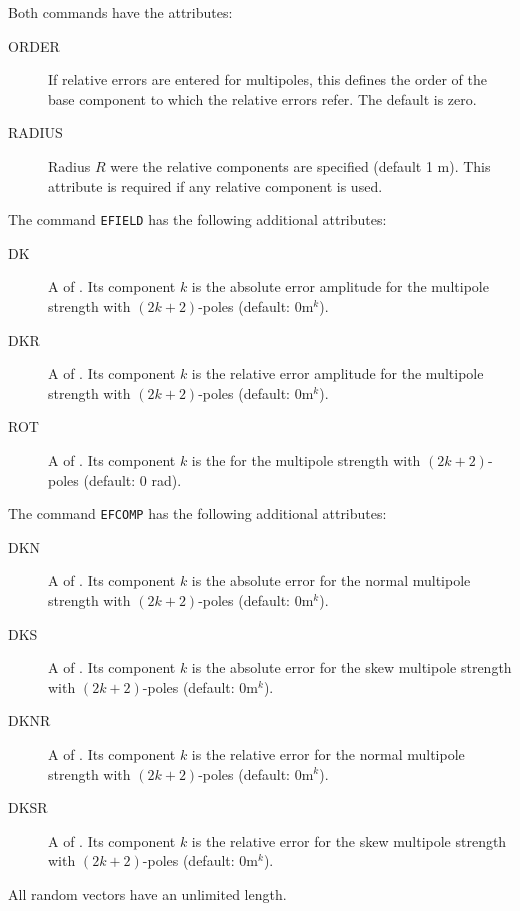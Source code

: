 Both commands have the attributes:
\begin{description}
\item[ORDER]
  If relative errors are entered for multipoles,
  this defines the order of the base component to which the relative 
  errors refer.
  The default is zero.
\item[RADIUS]
  Radius $R$ were the relative components are specified (default 1 m).
  This attribute is required if any relative component is used.
\end{description}
The command \texttt{EFIELD} has the following additional attributes:
\begin{description}
\item[DK]
  A  of .
  Its component $k$ is the absolute error amplitude 
  for the multipole strength with $(2k+2)$-poles 
  (default: $0 \mathrm{m}^k$).
\item[DKR]
  A  of .
  Its component $k$ is the relative error amplitude 
  for the multipole strength with $(2k+2)$-poles 
  (default: $0 \mathrm{m}^k$).
\item[ROT]
  A  of .
  Its component $k$ is the 
  for the multipole strength with $(2k+2)$-poles 
  (default: 0 rad).
\end{description}
The command \texttt{EFCOMP} has the following additional attributes:
\begin{description}
\item[DKN]
  A  of .
  Its component $k$ is the absolute error for the normal multipole 
  strength with $(2k+2)$-poles (default: $0 \mathrm{m}^k$).
\item[DKS]
  A  of .
  Its component $k$ is the absolute error for the skew multipole 
  strength with $(2k+2)$-poles (default: $0 \mathrm{m}^k$).
\item[DKNR]
  A  of .
  Its component $k$ is the relative error for the normal multipole 
  strength with $(2k+2)$-poles (default: $0 \mathrm{m}^k$).
\item[DKSR]
  A  of .
  Its component $k$ is the relative error for the skew multipole 
  strength with $(2k+2)$-poles (default: $0 \mathrm{m}^k$).
\end{description}
All random vectors have an unlimited length.

